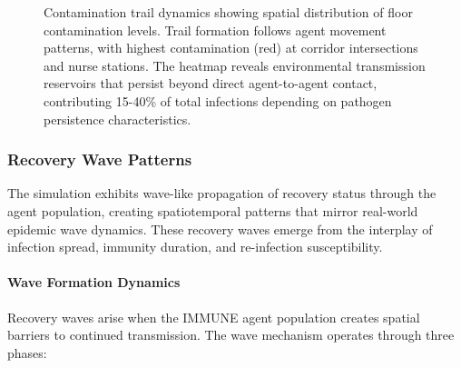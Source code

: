 \begin{figure}[t]
\centering
{}
\caption{Contamination trail dynamics showing spatial distribution of floor contamination levels. Trail formation follows agent movement patterns, with highest contamination (red) at corridor intersections and nurse stations. The heatmap reveals environmental transmission reservoirs that persist beyond direct agent-to-agent contact, contributing 15-40\% of total infections depending on pathogen persistence characteristics.}
\label{fig:contamination-trails}
\end{figure}

\subsubsection{Recovery Wave Patterns}
\label{sec:recovery-waves}

The simulation exhibits wave-like propagation of recovery status through the agent population, creating spatiotemporal patterns that mirror real-world epidemic wave dynamics. These recovery waves emerge from the interplay of infection spread, immunity duration, and re-infection susceptibility.

\paragraph{Wave Formation Dynamics}

Recovery waves arise when the IMMUNE agent population creates spatial barriers to continued transmission. The wave mechanism operates through three phases:

